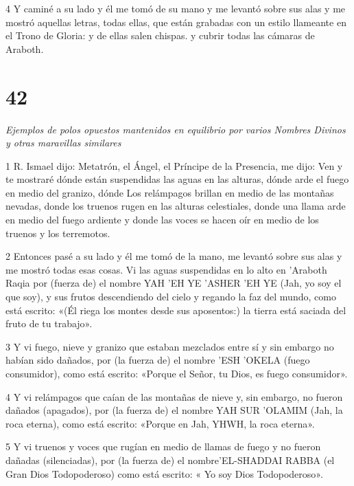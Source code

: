 \par 4 Y caminé a su lado y él me tomó de su mano y me levantó sobre sus alas y me mostró aquellas letras, todas ellas, que están grabadas con un estilo llameante en el Trono de Gloria: y de ellas salen chispas. y cubrir todas las cámaras de Araboth.


\chapter{42}

\par \textit{Ejemplos de polos opuestos mantenidos en equilibrio por varios Nombres Divinos y otras maravillas similares}

\par 1 R. Ismael dijo: Metatrón, el Ángel, el Príncipe de la Presencia, me dijo: Ven y te mostraré dónde están suspendidas las aguas en las alturas, dónde arde el fuego en medio del granizo, dónde Los relámpagos brillan en medio de las montañas nevadas, donde los truenos rugen en las alturas celestiales, donde una llama arde en medio del fuego ardiente y donde las voces se hacen oír en medio de los truenos y los terremotos.

\par 2 Entonces pasé a su lado y él me tomó de la mano, me levantó sobre sus alas y me mostró todas esas cosas. Vi las aguas suspendidas en lo alto en 'Araboth Raqia por (fuerza de) el nombre YAH 'EH YE 'ASHER 'EH YE (Jah, yo soy el que soy), y sus frutos descendiendo del cielo y regando la faz del mundo, como está escrito: «(Él riega los montes desde sus aposentos:) la tierra está saciada del fruto de tu trabajo».

\par 3 Y vi fuego, nieve y granizo que estaban mezclados entre sí y sin embargo no habían sido dañados, por (la fuerza de) el nombre 'ESH 'OKELA (fuego consumidor), como está escrito: «Porque el Señor, tu Dios, es fuego consumidor».

\par 4 Y vi relámpagos que caían de las montañas de nieve y, sin embargo, no fueron dañados (apagados), por (la fuerza de) el nombre YAH SUR 'OLAMIM (Jah, la roca eterna), como está escrito: «Porque en Jah, YHWH, la roca eterna».

\par 5 Y vi truenos y voces que rugían en medio de llamas de fuego y no fueron dañadas (silenciadas), por (la fuerza de) el nombre'EL-SHADDAI RABBA (el Gran Dios Todopoderoso) como está escrito: « Yo soy Dios Todopoderoso».

